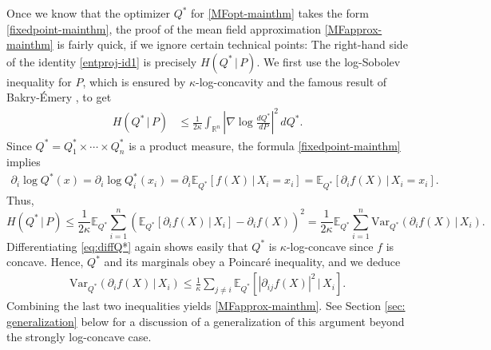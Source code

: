 \documentclass[11pt,reqno]{amsart}
\numberwithin{equation}{section}
\theoremstyle{definition}
\def\E{{\mathbb E}}
\def\R{{\mathbb R}}
\def\Var{{\mathrm{Var}}}
\begin{document}
Once we know that the optimizer $Q^*$ for \eqref{MFopt-mainthm} takes the form \eqref{fixedpoint-mainthm}, the proof of the mean field approximation \eqref{MFapprox-mainthm} is fairly quick, if we ignore certain technical points:
The right-hand side of the identity \eqref{entproj-id1} is precisely $H(Q^*\,|\,P)$.  We first use the log-Sobolev inequality for $P$, which is ensured by $\kappa$-log-concavity and the famous result of Bakry-\'Emery \cite{bakryemery}, to get
\begin{align*}
	H(Q^*\,|\,P) &\le \frac{1}{2\kappa}\int_{\R^n}\left|\nabla \log \frac{dQ^*}{dP}\right|^2\,dQ^*.
\end{align*}
Since $Q^*=Q^*_1\times \cdots \times Q^*_n$ is a product measure,  the formula \eqref{fixedpoint-mainthm} implies
\begin{align}
	\partial_i \log Q^*(x) = \partial_i\log Q^*_i(x_i) = \partial_i\E_{Q^*}[ f(X)\,|\,X_i=x_i] = \E_{Q^*}[\partial_i f(X)\,|\,X_i=x_i]. \label{eq:diffQ*}
\end{align}
Thus,
\begin{equation*}
	H(Q^*\,|\,P) \le \frac{1}{2\kappa} \E_{Q^*}\sum_{i=1}^n \left(\E_{Q^*}[\partial_i f(X)\,|\,X_i] - \partial_if(X)\right)^2  = \frac{1}{2\kappa}\E_{Q^*}\sum_{i=1}^n \Var_{Q^*}(\partial_i f(X)\,|\,X_i).
\end{equation*}
Differentiating \eqref{eq:diffQ*} again shows easily that $Q^*$ is $\kappa$-log-concave since $f$ is concave. Hence, $Q^*$ and its marginals obey a Poincar\'e inequality, and we deduce
\begin{align*}
	\Var_{Q^*}(\partial_i f(X)\,|\,X_i) \le \frac{1}{\kappa}\sum_{j \neq i}\E_{Q^*}\left[|\partial_{ij}f(X)|^2\,|\,X_i\right].
\end{align*}
Combining the last two inequalities yields \eqref{MFapprox-mainthm}. See Section \ref{sec: generalization} below for a discussion of a generalization of this argument beyond the strongly log-concave case.
\end{document}
